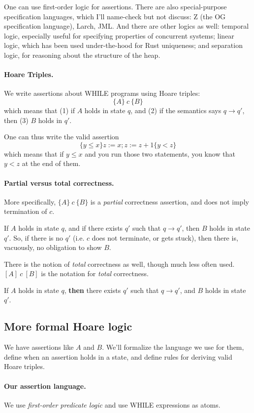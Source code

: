 \documentclass[11pt]{article}
\begin{document}
One can use first-order logic for assertions. There are also
special-purpose specification languages, which I'll name-check but not
discuss: Z (the OG specification language), Larch, JML.  And there are
other logics as well: temporal logic, especially useful for specifying
properties of concurrent systems; linear logic, which has been used
under-the-hood for Rust uniqueness; and separation logic, for
reasoning about the structure of the heap.

\paragraph{Hoare Triples.} We write assertions about WHILE programs using Hoare triples:
\[ \{ A \} ~c~ \{ B \} \]
which means that (1) if $A$ holds in state $q$, and (2) if the semantics says $q \rightarrow q'$, then (3) $B$ holds in $q'$.

One can thus write the valid assertion
\[ \{ y \leq x \} z := x; z := z + 1 \{ y < z \} \]
which means that if $y \leq x$ and you run those two statements, you know that $y < z$ at the end of them.

\paragraph{Partial versus total correctness.} More specifically, $\{A\} ~c~ \{ B\}$ is a \emph{partial} correctness assertion,
and does not imply termination of $c$.

If $A$ holds in state $q$, and if there exists $q'$ such that $q \rightarrow q'$, then $B$ holds in state $q'$. So,
if there is no $q'$ (i.e. $c$ does not terminate, or gets stuck), then there is, vacuously, no obligation to show $B$.

There is the notion of \emph{total} correctness as well, though much less often used. $[A] ~c~ [B]$ is the notation for
\emph{total} correctness.

If $A$ holds in state $q$, {\bf then} there exists $q'$ such that $q \rightarrow q'$, and $B$ holds in state $q'$.

\subsection*{More formal Hoare logic}
We have assertions like $A$ and $B$. We'll formalize the language we use for them,
define when an assertion holds in a state, and define rules for deriving valid Hoare triples.

\paragraph{Our assertion language.}
We use \emph{first-order predicate logic} and use WHILE expressions as atoms.
\end{document}

